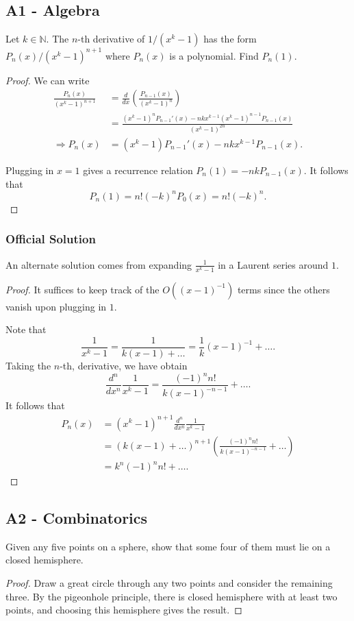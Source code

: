 \documentclass[11pt]{scrartcl}
\newcommand{\N}{\mathbb{N}}
\newcommand{\<}{\langle}
\renewcommand{\>}{\rangle}
\begin{document}
\subsection{A1 - Algebra}
Let $k \in \N$.  The $n$-th derivative of $1/(x^{k}-1)$ has the form $P_n(x)/(x^{k}-1)^{n+1}$ where $P_n(x)$ is a polynomial.  Find $P_n(1)$.
\begin{proof}
We can write 
\begin{align*}
\frac{P_{n}(x)}{(x^k-1)^{n+1}} &= \frac{d}{dx} \left( \frac{P_{n-1}(x)}{(x^k - 1)^n}\right) \\
&= \frac{(x^k - 1)^n P_{n-1}'(x) - nkx^{k-1}(x^k - 1)^{n-1} P_{n-1}(x)}{(x^k - 1)^{2n}} \\
\Longrightarrow P_n(x) &= (x^k -1)P_{n-1}'(x) - nkx^{k-1}P_{n-1}(x).
\end{align*}

Plugging in $x = 1$ gives a recurrence relation $P_n(1) = -nk P_{n-1}(x)$.  It follows that $$P_n(1) = n!(-k)^n P_0(x) = n!(-k)^n.$$

\end{proof}
\subsubsection{Official Solution}
An alternate solution comes from expanding $\frac{1}{x^k - 1}$ in a Laurent series around $1$.  
\begin{proof}
It suffices to keep track of the $O((x-1)^{-1})$ terms since the others vanish upon plugging in $1$.

Note that 
$$\frac{1}{x^k - 1} = \frac{1}{k(x-1) + \dots} = \frac{1}{k} (x-1)^{-1} + \dots.$$
Taking the $n$-th, derivative, we have obtain 
$$\frac{d^n}{dx^n} \frac{1}{x^k - 1} = \frac{(-1)^n n!}{k(x-1)^{-n-1}} + \dots.$$
It follows that 
\begin{align*}
P_n(x) &= (x^k - 1)^{n + 1} \frac{d^n}{dx^n} \frac{1}{x^k - 1} \\
&= (k(x-1) + \dots)^{n+1} \left(\frac{(-1)^n n!}{k(x-1)^{-n-1}} + \dots \right) \\
&= k^n (-1)^n n! + \dots.
\end{align*}
\end{proof}

\subsection{A2 - Combinatorics}
Given any five points on a sphere, show that some four of them must lie on a closed hemisphere.  
\begin{proof}
Draw a great circle through any two points and consider the remaining three.  By the pigeonhole principle, there is closed hemisphere with at least two points, and choosing this hemisphere gives the result.  
\end{proof}
\end{document}
